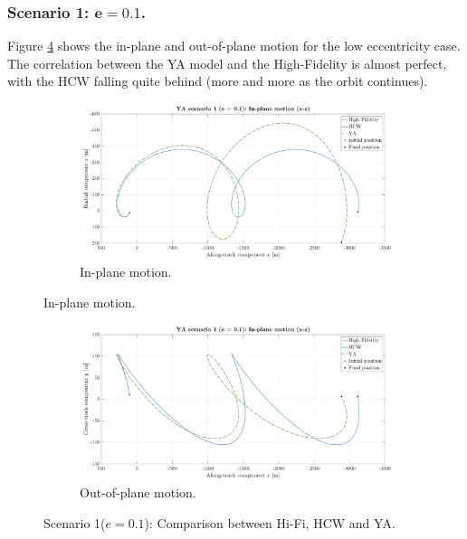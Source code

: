 		\subsubsection{Scenario 1: $\bm{e = 0.1}$.}
		\indent Figure \ref{figCh3:Scenario1} shows the in-plane and out-of-plane motion for the low eccentricity case. The correlation between the YA model and the High-Fidelity is almost perfect, with the HCW falling quite behind (more and more as the orbit continues).
		\begin{figure}[!htb]
		\begin{changemargin}{-2.2cm}{-1cm}
		\begin{adjustbox}{width=1.2\textwidth}
		\centering
		\medskip
		\begin{subfigure}[t]{1.1\linewidth}
		\centering\includegraphics[width=\linewidth]{Chapters/Chapter_03/Low_quality/YA_scenario_1_(e___0_1)_IP}
		\caption{In-plane motion.}
		\label{figCh3:Scenario1_IP}
		\end{subfigure}
		\end{adjustbox}
		\end{changemargin}
		\end{figure}
		\begin{figure}
		\begin{changemargin}{-2.2cm}{-1cm}
		\begin{adjustbox}{width=1.2\textwidth}
		\ContinuedFloat
		\centering
		\begin{subfigure}[t]{1.2\linewidth}
		\centering\includegraphics[width=\linewidth]{Chapters/Chapter_03/Low_quality/YA_scenario_1_(e___0_1)_OOP}
		\caption{Out-of-plane motion.}
		\label{figCh3:Scenario1_OOP}
		\end{subfigure}
		\end{adjustbox}
		\end{changemargin}
		\caption{Scenario 1($e= 0.1$): Comparison between Hi-Fi, HCW and YA. }
		\label{figCh3:Scenario1}
		\end{figure}
		\FloatBarrier
		
